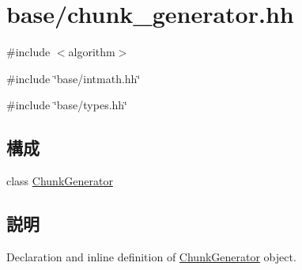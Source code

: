\hypertarget{chunk__generator_8hh}{
\section{base/chunk\_\-generator.hh}
\label{chunk__generator_8hh}
}
{\ttfamily \#include $<$algorithm$>$}\par
{\ttfamily \#include \char`\"{}base/intmath.hh\char`\"{}}\par
{\ttfamily \#include \char`\"{}base/types.hh\char`\"{}}\par
\subsection*{構成}
\begin{DoxyCompactItemize}
\item 
class \hyperlink{classChunkGenerator}{ChunkGenerator}
\end{DoxyCompactItemize}


\subsection{説明}
Declaration and inline definition of \hyperlink{classChunkGenerator}{ChunkGenerator} object. 